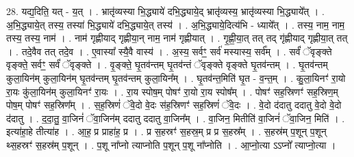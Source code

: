 \documentclass[17pt]{extarticle}
\begin{document}
28. यद्य॒दिति॒ यत् - य॒त् । . भ्रातृ॑व्यस्या भि॒द्ध्याये॑ दभि॒द्ध्याये॒द् भ्रातृ॑व्यस्य॒ भ्रातृ॑व्यस्या भि॒द्ध्याये᳚त् । . अ॒भि॒द्ध्याये॒त् तस्य॒ तस्या॑ भि॒द्ध्याये॑ दभि॒द्ध्याये॒त् तस्य॑ । . अ॒भि॒द्ध्याये॒दित्य॑भि - ध्याये᳚त् । . तस्य॒ नाम॒ नाम॒ तस्य॒ तस्य॒ नाम॑ । . नाम॑ गृह्णीयाद् गृह्णीया॒न् नाम॒ नाम॑ गृह्णीयात् । . गृ॒ह्णी॒या॒त् तत् तद् गृ॑ह्णीयाद् गृह्णीया॒त् तत् । . तदे॒वैव तत् तदे॒व । . ए॒वास्या᳚ स्यै॒वै वास्य॑ । . अ॒स्य॒ सर्वꣳ॒॒ सर्व॑ मस्यास्य॒ सर्व᳚म् । . सर्वं॑ ॅवृङ्क्ते वृङ्क्ते॒ सर्वꣳ॒॒ सर्वं॑ ॅवृङ्क्ते । . वृ॒ङ्क्ते॒ घृ॒तव॑न्तम् घृ॒तव॑न्तं ॅवृङ्क्ते वृङ्क्ते घृ॒तव॑न्तम् । . घृ॒तव॑न्तम् कुला॒यिन॑म् कुला॒यिन॑म् घृ॒तव॑न्तम् घृ॒तव॑न्तम् कुला॒यिन᳚म् । . घृ॒तव॑न्त॒मिति॑ घृ॒त - व॒न्त॒म् । . कु॒ला॒यिनꣳ॑ रा॒यो रा॒यः कु॑ला॒यिन॑म् कुला॒यिनꣳ॑ रा॒यः । . रा॒य स्पोष॒म् पोषꣳ॑ रा॒यो रा॒य स्पोष᳚म् । . पोषꣳ॑ सह॒स्रिणꣳ॑ सह॒स्रिण॒म् पोष॒म् पोषꣳ॑ सह॒स्रिण᳚म् । . स॒ह॒स्रिणं॑ ॅवे॒दो वे॒दः स॑ह॒स्रिणꣳ॑ सह॒स्रिणं॑ ॅवे॒दः । . वे॒दो द॑दातु ददातु वे॒दो वे॒दो द॑दातु । . द॒दा॒तु॒ वा॒जिनं॑ ॅवा॒जिन॑म् ददातु ददातु वा॒जिन᳚म् । . वा॒जिन॒ मितीति॑ वा॒जिनं॑ ॅवा॒जिन॒ मिति॑ । . इत्या॑हा॒हे तीत्या॑ह । . आ॒ह॒ प्र प्राहा॑ह॒ प्र । . प्र स॒हस्रꣳ॑ स॒हस्र॒म् प्र प्र स॒हस्र᳚म् । . स॒हस्र॑म् प॒शून् प॒शून् थ्स॒हस्रꣳ॑ स॒हस्र॑म् प॒शून् । . प॒शू ना᳚प्नो त्याप्नोति प॒शून् प॒शू ना᳚प्नोति । . आ॒प्नो॒त्या ऽऽप्नो᳚ त्याप्नो॒त्या । \newline
\end{document}
